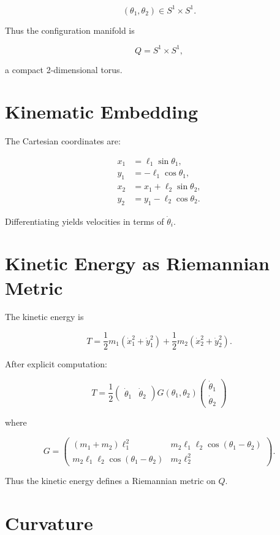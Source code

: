 \documentclass[11pt]{book}
\begin{document}
\[
(\theta_1,\theta_2) \in S^1 \times S^1.
\]

Thus the configuration manifold is

\[
Q = S^1 \times S^1,
\]

a compact 2-dimensional torus.

\section{Kinematic Embedding}

The Cartesian coordinates are:

\begin{align}
x_1 &= \ell_1 \sin\theta_1, \\
y_1 &= -\ell_1 \cos\theta_1, \\
x_2 &= x_1 + \ell_2 \sin\theta_2, \\
y_2 &= y_1 - \ell_2 \cos\theta_2.
\end{align}

Differentiating yields velocities in terms of $\dot\theta_i$.

\section{Kinetic Energy as Riemannian Metric}

The kinetic energy is

\[
T = \frac12 m_1(\dot x_1^2+\dot y_1^2)
    +\frac12 m_2(\dot x_2^2+\dot y_2^2).
\]

After explicit computation:

\[
T = \frac12
\begin{pmatrix}
\dot\theta_1 & \dot\theta_2
\end{pmatrix}
G(\theta_1,\theta_2)
\begin{pmatrix}
\dot\theta_1 \\
\dot\theta_2
\end{pmatrix}
\]

where

\[
G =
\begin{pmatrix}
(m_1+m_2)\ell_1^2 &
m_2 \ell_1 \ell_2 \cos(\theta_1-\theta_2) \\
m_2 \ell_1 \ell_2 \cos(\theta_1-\theta_2) &
m_2 \ell_2^2
\end{pmatrix}.
\]

Thus the kinetic energy defines a Riemannian metric on $Q$.

\section{Curvature}
\end{document}
